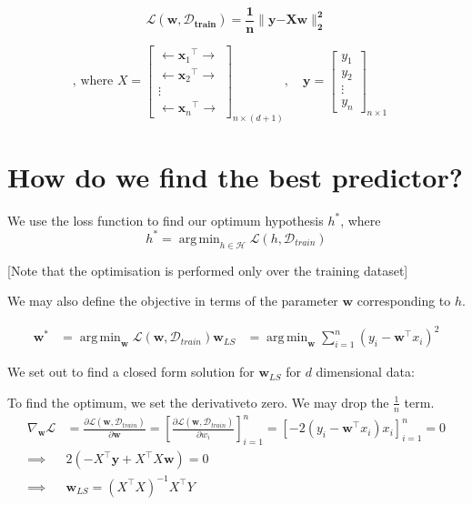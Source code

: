 \documentclass{report}
\newcommand{\tr}[1]{{{#1}^\top}} %
\newcommand{\w}{\mathbf{w}} %
\newcommand{\x}{\mathbf{x}}
\newcommand{\y}{\mathbf{y}}
\DeclareMathOperator*{\argmin}{arg\,min}
\newcommand{\loss}{\mathcal{L}}
\begin{document}
$$
  \boxed{\mathbf{\loss(\w, \mathcal{D}_{\text{train}}) = \frac{1}{n} \lVert \y \mathrm{-} X\w \rVert_2^2}}
$$

$$
  \text{, where } X =
  \begin{bmatrix}
    \longleftarrow{\tr{\x_1}} \longrightarrow \\
    \longleftarrow \tr{\x_2} \longrightarrow  \\
    \vdots                                    \\
    \longleftarrow \tr{\x_n} \longrightarrow
  \end{bmatrix}_{n\times (d+1)}, \quad
  \y =
  \begin{bmatrix}
    y_1    \\
    y_2    \\
    \vdots \\
    y_n
  \end{bmatrix}_{n\times 1}\quad
$$

\section{How do we find the best predictor?}

We use the loss function to find our optimum hypothesis $h^*$, where
$$
  h^* = \argmin_{h \in \mathcal{H}} \loss(h,\mathcal{D}_{train})
$$

[Note that the optimisation is performed only over the training dataset]

We may also define the objective in terms of the parameter $\w$ corresponding to $h$.

\begin{align}
  \w^*    & = \argmin_{\w} \loss(\w,\mathcal{D}_{train})
  \w_{LS} & = \argmin_{\w} \sum_{i=1}^n(y_i-\tr{\w} x_i)^2
\end{align}

We set out to find a closed form solution for \(\w_{LS}\) for $d$ dimensional data:

To find the optimum, we set the derivative\footnotemark[1] to zero. We may drop the \(\frac{1}{n}\) term.
\begin{align*}
  \nabla_\w\loss & = \frac{\partial{\loss(\w,\mathcal{D}_{train})}}{\partial{\w}} = \left[\frac{\partial{\loss(\w,\mathcal{D}_{train})}}{\partial{w_i}}\right]_{i=1}^n = \left[-2(y_i-\tr{\w} x_i)x_i\right]_{i=1}^n = 0 \\
  \implies       & 2(-\tr{X} \y + \tr{X} X\w) =0                                                                                                                                                                         \\
  \implies       & \w_{LS} = (\tr{X} X)^{-1}\tr{X} Y
\end{align*}
\end{document}
